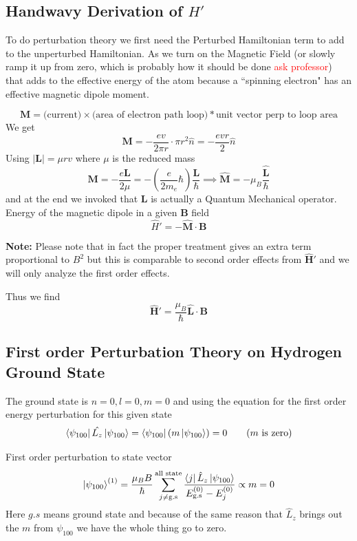 \documentclass[10pt]{article}
\renewcommand{\vec}{\mathbf}
\begin{document}
\subsection*{Handwavy Derivation of $H'$ }
To do perturbation theory we first need the Perturbed Hamiltonian term to add to the unperturbed Hamiltonian. As we turn on the Magnetic Field (or slowly ramp it up from zero, which is probably how it should be done \textcolor{red}{ask professor}) that adds to the effective energy of the atom because a ``spinning electron" has an effective magnetic dipole moment. 

\[
\vec{M} = \text{(current)} \times \text{(area of electron path loop)} * \text{unit vector perp to loop area}
\] 
We get
\[
\vec{M} = - \frac{ev}{2 \pi r} \cdot  \pi r^2  \hat{n} = - \frac{evr}{2} \hat{n}
\]
\newcommand{\hb}{\hbar} 
Using $|\vec{L}| = \mu r v$ where $\mu$ is the reduced mass
\[
\vec{M} = - \frac{e \vec{L}}{2 \mu} = - \left(\frac{e}{2 m_e} \hb \right) \frac{\vec{L}}{\hb} \implies 
\hat{\mathbf{M}} = - \mu_B \frac{\hat{\mathbf{L}}}{\hb}
\]
and at the end we invoked that $\vec{L}$ is actually a Quantum Mechanical operator.
Energy of the magnetic dipole in a given $\vec{B}$ field 
\[
	\hat{H}' = - \hat{\mathbf{M}}\cdot \vec{B}
\] 
\begin{margintable} \textbf{Note:}
	Please note that in fact the proper treatment gives an extra term  proportional to $B^2$ but this is comparable to second order effects from $\hat{\vec{H}}'$ and we will only analyze the first order effects. 
\end{margintable}
Thus we find 
\[
\boxed{
\hat{\vec{H}} ' = \frac{\mu_B}{\hb} \hat{\vec{L}}\cdot \vec{B}
}
\] 


\subsection*{First order Perturbation Theory on Hydrogen Ground State} 
The ground state is $n = 0, l = 0, m = 0$ and using the equation for the first order energy perturbation for this given state
\[
	\bra{\psi_{100}} \hat{L_z} \ket{\psi_{100}} =  \bra{\psi_{100}} \left(m \ket{\psi_{100}}\right) = 0 \tag{$m$ is zero}	
\] 

First order perturbation to state vector 
\[
	\ket{\psi_{100}}^{(1)} = \frac{\mu_B B}{\hb}
	\sum_{j \neq \text{g.s}}^{\text{all state}} \frac{\bra{j} \hat{L}_z \ket{\psi_{100}}}{E_{\text{g.s}}^{(0)} - E_j^{(0)}} \propto m =0
\] 	
Here $g.s$ means ground state and because of the same reason that $\hat{L}_z$ brings out the $m$ from $\psi_{100}$ we have the whole thing go to zero.
\end{document}

